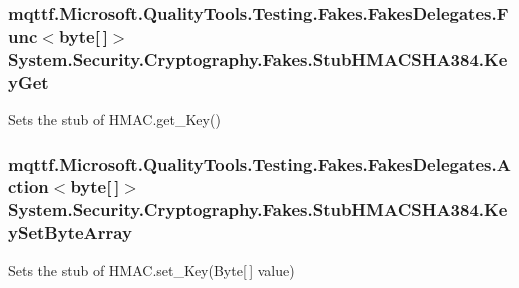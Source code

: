 \hypertarget{class_system_1_1_security_1_1_cryptography_1_1_fakes_1_1_stub_h_m_a_c_s_h_a384_aa1b2f67837cdf46454ceef0b674bc1a4}{
\subsubsection[{Key\-Get}]{\setlength{\rightskip}{0pt plus 5cm}mqttf.\-Microsoft.\-Quality\-Tools.\-Testing.\-Fakes.\-Fakes\-Delegates.\-Func$<$byte\mbox{[}$\,$\mbox{]}$>$ System.\-Security.\-Cryptography.\-Fakes.\-Stub\-H\-M\-A\-C\-S\-H\-A384.\-Key\-Get}}\label{class_system_1_1_security_1_1_cryptography_1_1_fakes_1_1_stub_h_m_a_c_s_h_a384_aa1b2f67837cdf46454ceef0b674bc1a4}


Sets the stub of H\-M\-A\-C.\-get\-\_\-\-Key()

\hypertarget{class_system_1_1_security_1_1_cryptography_1_1_fakes_1_1_stub_h_m_a_c_s_h_a384_af1967530eaf2ed5b9eabc41d3c9d5856}{
\subsubsection[{Key\-Set\-Byte\-Array}]{\setlength{\rightskip}{0pt plus 5cm}mqttf.\-Microsoft.\-Quality\-Tools.\-Testing.\-Fakes.\-Fakes\-Delegates.\-Action$<$byte\mbox{[}$\,$\mbox{]}$>$ System.\-Security.\-Cryptography.\-Fakes.\-Stub\-H\-M\-A\-C\-S\-H\-A384.\-Key\-Set\-Byte\-Array}}\label{class_system_1_1_security_1_1_cryptography_1_1_fakes_1_1_stub_h_m_a_c_s_h_a384_af1967530eaf2ed5b9eabc41d3c9d5856}


Sets the stub of H\-M\-A\-C.\-set\-\_\-\-Key(\-Byte\mbox{[}$\,$\mbox{]} value)

